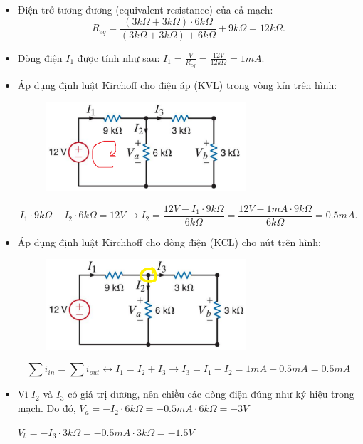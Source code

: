 \begin{itemize}
    \item Điện trở tương đương (equivalent resistance) của cả mạch:
    \[
    R_{eq} = \frac{(3k\Omega + 3k\Omega) \cdot 6k\Omega}{(3k\Omega + 3k\Omega) + 6k\Omega} + 9k\Omega = 12k\Omega.
    \]
    \item Dòng điện \(I_1\) được tính như sau: \(I_1 = \frac{V}{R_{eq}} = \frac{12V}{12k\Omega} = 1 mA.\)
    \item Áp dụng định luật Kirchoff cho điện áp (KVL) trong vòng kín trên hình: 
    \begin{figure}[!htbp]
        \centering
        \includegraphics[width=0.7\textwidth]{graphics/ex4/f1a.png}
    \end{figure}
    \[
    I_1 \cdot 9k\Omega + I_2 \cdot 6k\Omega = 12V
    \longrightarrow I_2 = \frac{12V -  I_1 \cdot 9k\Omega }{6k\Omega} = \frac{12V -  1mA \cdot 9k\Omega }{6k\Omega} = 0.5 mA.
    \]
    \newpage
    \item Áp dụng định luật Kirchhoff cho dòng điện (KCL) cho nút trên hình:
    \begin{figure}[!htbp]
        \centering
        \includegraphics[width=0.7\textwidth]{graphics/ex4/f1b.png}
    \end{figure}
    \[
    \displaystyle \sum i_{in} = \sum i_{out}
    \longleftrightarrow I_1 = I_2 + I_3
    \longrightarrow I_3 = I_1 - I_2 = 1mA - 0.5mA = 0.5mA
    \]
    \item Vì \(I_2\) và \(I_3\) có giá trị dương, nên chiều các dòng điện đúng như ký hiệu trong mạch. Do đó, 
    \(V_a = -I_2 \cdot 6k\Omega = - 0.5mA \cdot 6k\Omega = -3V\)

    \(V_b = -I_3 \cdot 3k\Omega = - 0.5mA \cdot 3k\Omega = -1.5V\) 
\end{itemize}

